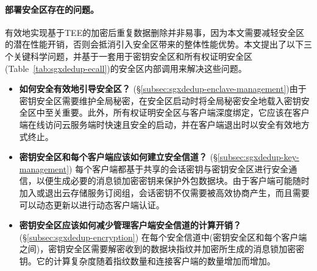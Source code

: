 \paragraph*{部署安全区存在的问题。}有效地实现基于TEE的加密后重复数据删除并非易事，因为本文需要减轻安全区的潜在性能开销，否则会抵消引入安全区带来的整体性能优势。本文提出了以下三个关键科学问题，并基于一套用于密钥安全区和所有权证明安全区(Table~\ref{tab:sgxdedup-ecall})的安全区内部调用来解决这些问题。

\begin{itemize}[leftmargin=0em]
  \item \textbf{如何安全有效地引导安全区？} (\S\ref{subsec:sgxdedup-enclave-management})由于密钥安全区需要维护全局秘密，在安全区启动时将全局秘密安全地载入密钥安全区中至关重要。此外，所有权证明安全区与客户端深度绑定，它应该在客户端在线访问云服务端时快速且安全的启动，并在客户端退出时以安全有效地方式终止。
  \item \textbf{密钥安全区和每个客户端应该如何建立安全信道？} (\S\ref{subsec:sgxdedup-key-management})
        每个客户端都基于共享的会话密钥与密钥安全区进行安全通信，以便生成必要的消息锁加密密钥来保护外包数据块。由于客户端可能随时加入或退出云存储服务订阅组，会话密钥不仅需要被高效协商产生，而且需要可以动态更新以进行动态客户端认证。
  \item \textbf{密钥安全区应该如何减少管理客户端安全信道的计算开销？} (\S\ref{subsec:sgxdedup-encryption})
        在每个安全信道中(密钥安全区和每个客户端之间)，密钥安全区需要解密收到的数据块指纹并加密所生成的消息锁加密密钥。它的计算复杂度随着指纹数量和连接客户端的数量增加而增加。
\end{itemize}
